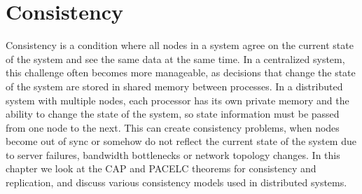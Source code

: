 \chapter{Consistency} \label{ch:consistency}

Consistency is a condition where all nodes in a system agree on the current state of the system and see the same data at the same time. In a centralized system, this challenge often becomes more manageable, as decisions that change the state of the system are stored in shared memory between processes. In a distributed system with multiple nodes, each processor has its own private memory and the ability to change the state of the system, so state information must be passed from one node to the next. This can create consistency problems, when nodes become out of sync or somehow do not reflect the current state of the system due to server failures, bandwidth bottlenecks or network topology changes. In this chapter we look at the CAP and PACELC theorems for consistency and replication, and discuss various consistency models used in distributed systems.




